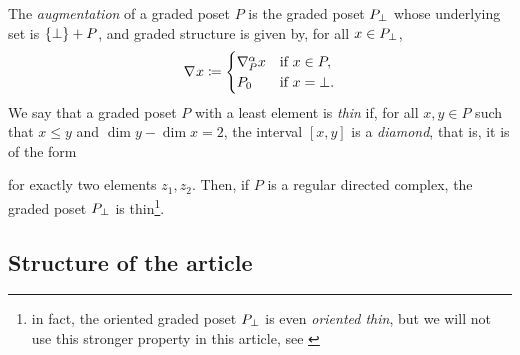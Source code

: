 The \emph{augmentation} of a graded poset \( P \) is the graded poset \( \augm{P} \) whose underlying set is \( \set{\bot} + P \), and graded structure is given by, for all \( x \in \augm{P} \),
\begin{equation*}
    \cofaces{}{} x \eqdef
    \begin{cases}
        \cofaces{P}{\a} x &\text{if } x \in P,\\
        \gr{0}{P}         &\text{if } x = \bot.
    \end{cases}
\end{equation*}
We say that a graded poset \( P \) with a least element is \emph{thin} if, for all \( x, y \in P \) such that \( x \le y \) and \( \dim y - \dim x = 2 \), the interval \( [x, y] \) is a \emph{diamond}, that is, it is of the form 
\begin{center}
\end{center}
for exactly two elements \( z_1, z_2 \).
Then, if \( P \) is a regular directed complex, the graded poset \( \augm{P} \) is thin\footnote{in fact, the oriented graded poset \( \augm{P} \) is even \emph{oriented thin}, but we will not use this stronger property in this article, see \cite[2.3.10]{hadzihasanovic2024combinatorics}}.

\subsection*{Structure of the article}

